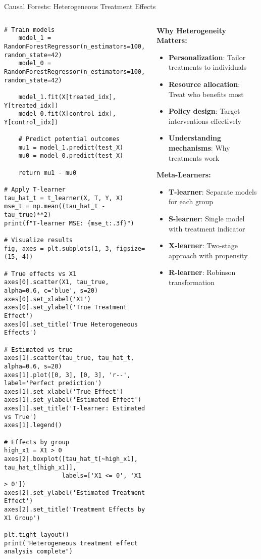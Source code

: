 \documentclass[aspectratio=169,11pt]{beamer}
\begin{document}
\begin{frame}[fragile]{Causal Forests: Heterogeneous Treatment Effects}
\begin{columns}
\begin{column}{0.55\textwidth}
\begin{lstlisting}[basicstyle=\ttfamily\tiny]
    # Train models
    model_1 = RandomForestRegressor(n_estimators=100, random_state=42)
    model_0 = RandomForestRegressor(n_estimators=100, random_state=42)
    
    model_1.fit(X[treated_idx], Y[treated_idx])
    model_0.fit(X[control_idx], Y[control_idx])
    
    # Predict potential outcomes
    mu1 = model_1.predict(test_X)
    mu0 = model_0.predict(test_X)
    
    return mu1 - mu0

# Apply T-learner
tau_hat_t = t_learner(X, T, Y, X)
mse_t = np.mean((tau_hat_t - tau_true)**2)
print(f"T-learner MSE: {mse_t:.3f}")

# Visualize results
fig, axes = plt.subplots(1, 3, figsize=(15, 4))

# True effects vs X1
axes[0].scatter(X1, tau_true, alpha=0.6, c='blue', s=20)
axes[0].set_xlabel('X1')
axes[0].set_ylabel('True Treatment Effect')
axes[0].set_title('True Heterogeneous Effects')

# Estimated vs true
axes[1].scatter(tau_true, tau_hat_t, alpha=0.6, s=20)
axes[1].plot([0, 3], [0, 3], 'r--', label='Perfect prediction')
axes[1].set_xlabel('True Effect')
axes[1].set_ylabel('Estimated Effect')
axes[1].set_title('T-learner: Estimated vs True')
axes[1].legend()

# Effects by group
high_x1 = X1 > 0
axes[2].boxplot([tau_hat_t[~high_x1], tau_hat_t[high_x1]], 
                labels=['X1 <= 0', 'X1 > 0'])
axes[2].set_ylabel('Estimated Treatment Effect')
axes[2].set_title('Treatment Effects by X1 Group')

plt.tight_layout()
print("Heterogeneous treatment effect analysis complete")
\end{lstlisting}
\end{column}
\begin{column}{0.45\textwidth}
\textbf{Why Heterogeneity Matters:}
\begin{itemize}
\item \textbf{Personalization}: Tailor treatments to individuals
\item \textbf{Resource allocation}: Treat who benefits most
\item \textbf{Policy design}: Target interventions effectively
\item \textbf{Understanding mechanisms}: Why treatments work
\end{itemize}

\vspace{0.3cm}
\textbf{Meta-Learners:}
\begin{itemize}
\item \textbf{T-learner}: Separate models for each group
\item \textbf{S-learner}: Single model with treatment indicator
\item \textbf{X-learner}: Two-stage approach with propensity
\item \textbf{R-learner}: Robinson transformation
\end{itemize}


\end{column}
\end{columns}
\end{frame}
\end{document}
